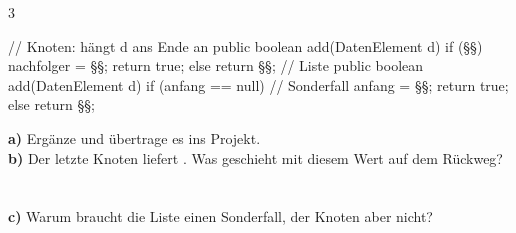 \documentclass[11pt,a4paper]{article}
\begin{document}
\newpage
\begin{aufgabe}{3}
\begin{minipage}[t]{0.52\linewidth}
\vspace{0pt}
\begin{java}[basicstyle=\ttfamily\scriptsize]
// Knoten: hängt d ans Ende an
public boolean add(DatenElement d) {
   if (§§) {
      nachfolger = §§;
      return true;
   } else {
      return §§;
   }
}
// Liste
public boolean add(DatenElement d) {
   if (anfang == null) {     // Sonderfall
      anfang = §§;
      return true;
   } else {
      return §§;
   }
}
\end{java}
\end{minipage}\hfill
\begin{minipage}[t]{0.45\linewidth}
\vspace{0pt}\raggedright
\textbf{a)} Ergänze  und übertrage es ins Projekt.\\[1.5mm]
\textbf{b)} Der letzte Knoten liefert . Was geschieht mit diesem Wert auf dem Rückweg?\\
\\[1mm]
\\[1.5mm]
\textbf{c)} Warum braucht die Liste einen Sonderfall, der Knoten aber nicht?\\
\\[1mm]
\end{minipage}
\end{aufgabe}
\end{document}

